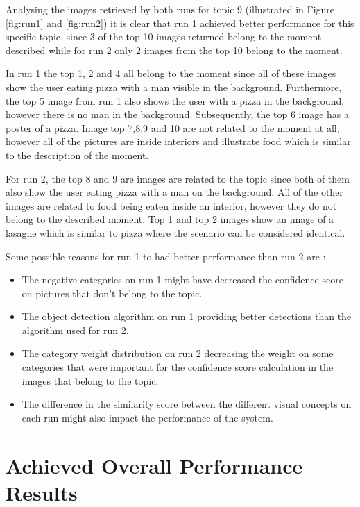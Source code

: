   Analysing the images retrieved by both runs for topic 9 (illustrated in Figure \ref{fig:run1} and \ref{fig:run2}) it is clear that run 1 achieved better performance for this specific topic, since 3 of the top 10 images returned belong to the moment described while for run 2 only 2 images from the top 10 belong to the moment. 
  
  
  In run 1 the top 1, 2 and 4 all belong to the moment since all of these images show the user eating pizza with a man visible in the background. Furthermore, the top 5 image from run 1 also shows the user with a pizza in the background, however there is no man in the background. Subsequently, the top 6 image has a poster of a pizza. Image top 7,8,9 and 10 are not related to the moment at all, however all of the pictures are inside interiors and illustrate food which is similar to the description of the moment.

    
  For run 2, the top 8 and 9 are images are related to the topic since both of them also show the user eating pizza with a man on the background. All of the other images are related to food being eaten inside an interior, however they do not belong to the described moment. Top 1 and top 2 images show an image of a lasagne which is similar to pizza where the scenario can be considered identical.

  Some possible reasons for run 1 to had better performance than run 2 are :

  \begin{itemize}
    \itemsep0em
    \item The negative categories on run 1 might have decreased the confidence score on  pictures that don't belong to the topic.
    \item The object detection algorithm on run 1 providing better detections than the algorithm used for run 2.
    \item The category weight distribution on run 2 decreasing the weight on some categories that were important for the confidence score calculation in the images that belong to the topic.
    \item The difference in the similarity score between the different visual concepts on each run might also impact the performance of the system.
  \end{itemize}

\newpage

\section{Achieved Overall Performance Results}
\label{sec:perfomance_results}

